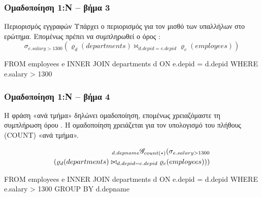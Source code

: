 \begin{frame}
\frametitle{Ομαδοποίηση 1:Ν -- βήμα 3}
\begin{minipage}{\wE}
  \begin{block}{Περιορισμός εγγραφών}
Υπάρχει ο περιορισμός για τον μισθό των υπαλλήλων στο ερώτημα.
Επομένως πρέπει να συμπληρωθεί ο όρος \twhere:
\[
   \sigma_{e.salary > 1300}
   (
     \varrho_{d}(departments)  \bowtie_{d.depid = e.depid}  \varrho_{e}(employees)
   )
\]
\pause
\en
\begin{SQL}
    FROM employees e INNER JOIN departments d
         ON e.depid = d.depid
   WHERE e.salary > 1300
\end{SQL}
\el
  \end{block}
\end{minipage}
\end{frame}



\begin{frame}
\frametitle{Ομαδοποίηση 1:Ν -- βήμα 4}
\begin{minipage}{\wE}
  \begin{block}{}
Η φράση {\cbb «ανά τμήμα»} δηλώνει ομαδοποίηση, επομένως χρειαζόμαστε τη συμπλήρωση  όρου {\sq \tgroupby}.
Η ομαδοποίηση χρειάζεται για τον υπολογισμό του πλήθους ({\sq COUNT}) {\cbb «ανά τμήμα»}.

\[
  \begin{split} 
   {}_{d.depname} \mathscr{G}_{count(*)}
   (
     \sigma_{e.salary > 1300}  \\
     (
       \varrho_{d}(departments)  \bowtie_{d.depid = e.depid}  \varrho_{e}(employees)
     )
   )
  \end{split} 
\]
\pause
\en
\begin{SQL}
    FROM employees e INNER JOIN departments d
         ON e.depid = d.depid
   WHERE e.salary > 1300
GROUP BY d.depname
\end{SQL}
\el
  \end{block}
\end{minipage}
\end{frame}



